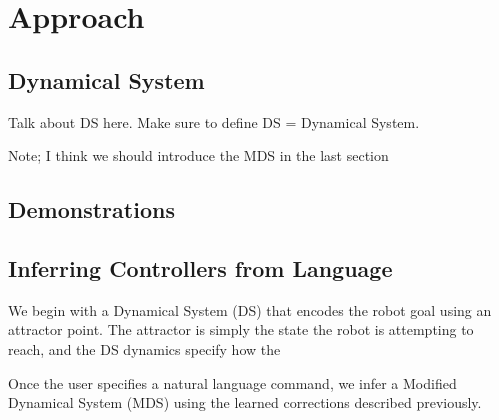 \section{Approach}
\label{sec:approach}

\subsection{Dynamical System}

Talk about DS here. Make sure to define DS = Dynamical System.

Note; I think we should introduce the MDS in the last section

\subsection{Demonstrations}

\subsection{Inferring Controllers from Language}

We begin with a Dynamical System (DS) that encodes the robot goal using an attractor point.
The attractor is simply the state the robot is attempting to reach, and the DS dynamics specify how the

Once the user specifies a natural language command, we infer a Modified Dynamical System (MDS) using the learned corrections described previously.


